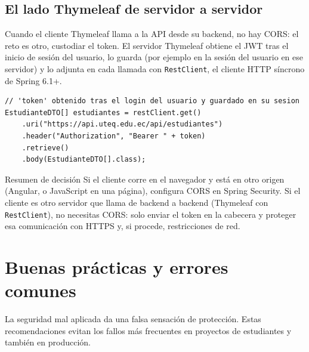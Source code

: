 \documentclass[11pt]{article}
\begin{document}
\subsection{El lado Thymeleaf de servidor a servidor}
Cuando el cliente Thymeleaf llama a la API desde su backend, no hay CORS: el reto es otro, custodiar el token. El servidor Thymeleaf obtiene el JWT tras el inicio de sesión del usuario, lo guarda (por ejemplo en la sesión del usuario en ese servidor) y lo adjunta en cada llamada con \texttt{RestClient}, el cliente HTTP síncrono de Spring 6.1+.

\begin{cajacodigo}
\begin{lstlisting}[style=java]
// 'token' obtenido tras el login del usuario y guardado en su sesion
EstudianteDTO[] estudiantes = restClient.get()
    .uri("https://api.uteq.edu.ec/api/estudiantes")
    .header("Authorization", "Bearer " + token)
    .retrieve()
    .body(EstudianteDTO[].class);
\end{lstlisting}
\end{cajacodigo}

\begin{cajatip}{Resumen de decisión}
Si el cliente corre en el navegador y está en otro origen (Angular, o JavaScript en una página), configura CORS en Spring Security. Si el cliente es otro servidor que llama de backend a backend (Thymeleaf con \texttt{RestClient}), no necesitas CORS: solo enviar el token en la cabecera y proteger esa comunicación con HTTPS y, si procede, restricciones de red.\par
\end{cajatip}

\section{Buenas prácticas y errores comunes}
La seguridad mal aplicada da una falsa sensación de protección. Estas recomendaciones evitan los fallos más frecuentes en proyectos de estudiantes y también en producción.
\end{document}
